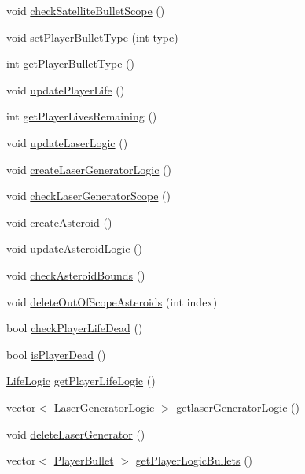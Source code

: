 \begin{DoxyCompactItemize}
void \hyperlink{class_game_logic_a196e25b5a240f8383ce8eab971938fc6}{check\+Satellite\+Bullet\+Scope} ()
\item 
void \hyperlink{class_game_logic_a8463ab82ec024ace6457030f61430fc1}{set\+Player\+Bullet\+Type} (int type)
\item 
int \hyperlink{class_game_logic_a933e3cb807803f40baa6dd8dffedd000}{get\+Player\+Bullet\+Type} ()
\item 
void \hyperlink{class_game_logic_a1737f742ce3b179ea3b5f579a97e7d47}{update\+Player\+Life} ()
\item 
int \hyperlink{class_game_logic_a42fb536e1740b6eeb4f80840250d685f}{get\+Player\+Lives\+Remaining} ()
\item 
void \hyperlink{class_game_logic_ae7b71b5f335308748366385de5c0d88a}{update\+Laser\+Logic} ()
\item 
void \hyperlink{class_game_logic_ae19f7458c9a738410d9c54a393346e35}{create\+Laser\+Generator\+Logic} ()
\item 
void \hyperlink{class_game_logic_ada1e9103a2d46866076c2d3b69c7eaff}{check\+Laser\+Generator\+Scope} ()
\item 
void \hyperlink{class_game_logic_ad9b8589c1559ac09ae5674c5c87be600}{create\+Asteroid} ()
\item 
void \hyperlink{class_game_logic_aefda6025dfef46818697b11f4276dfa6}{update\+Asteroid\+Logic} ()
\item 
void \hyperlink{class_game_logic_a35dcb163c584e620b876def784cbd7a4}{check\+Asteroid\+Bounds} ()
\item 
void \hyperlink{class_game_logic_ae2bb92c22bea679a7467c592f253263b}{delete\+Out\+Of\+Scope\+Asteroids} (int index)
\item 
bool \hyperlink{class_game_logic_a612e0df42ffe7ab590ce5a87c94aa6c9}{check\+Player\+Life\+Dead} ()
\item 
bool \hyperlink{class_game_logic_a743d03f2c6dab3786addba9b2bc1e5dc}{is\+Player\+Dead} ()
\item 
\hyperlink{class_life_logic}{Life\+Logic} \hyperlink{class_game_logic_ad30541663e6b28e997646173fbdf344e}{get\+Player\+Life\+Logic} ()
\item 
vector$<$ \hyperlink{class_laser_generator_logic}{Laser\+Generator\+Logic} $>$ \hyperlink{class_game_logic_abe0e031ff3278ebb3c049b06f458e5b4}{getlaser\+Generator\+Logic} ()
\item 
void \hyperlink{class_game_logic_adc970904cd9d94e6e64b733863839ddf}{delete\+Laser\+Generator} ()
\item 
vector$<$ \hyperlink{class_player_bullet}{Player\+Bullet} $>$ \hyperlink{class_game_logic_a52d34b124f0bf66dee3a144e4645e60c}{get\+Player\+Logic\+Bullets} ()

\end{DoxyCompactItemize}
